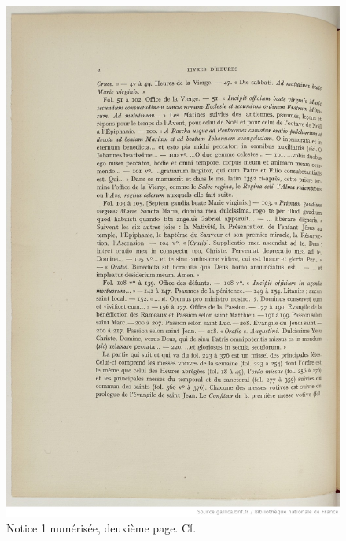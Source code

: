 \documentclass[a4paper,12pt,twoside]{book}
\begin{document}
    \begin{figure}[!h]
    \centering
    \includegraphics[width=15cm]{img/Notices_Leroquais/Notice1/Papier/noticepapier_1_2.jpeg}
    \caption{Notice 1 numérisée, deuxième page. Cf. \cite[p. 2]{Leroquais_notices}}
    \end{figure}
    \clearpage
    
\end{document}
